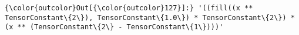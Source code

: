 \documentclass{article}
\begin{document}
            \begin{Verbatim}[commandchars=\\\{\}]
{\color{outcolor}Out[{\color{outcolor}127}]:} '((fill((x ** TensorConstant\{2\}), TensorConstant\{1.0\}) * TensorConstant\{2\}) * (x ** (TensorConstant\{2\} - TensorConstant\{1\})))'
\end{Verbatim}
        

    
    
    
    
\end{document}
